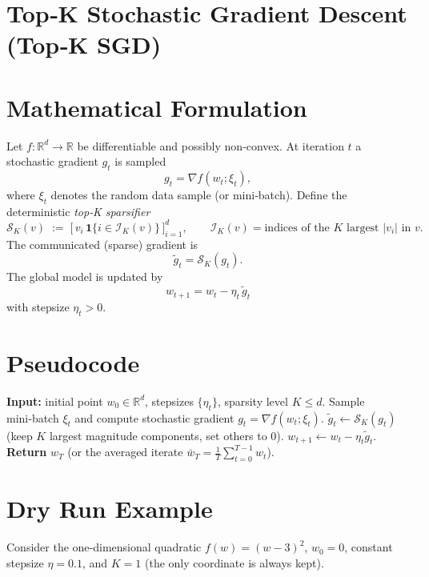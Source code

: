 \documentclass{article}
\newcommand{\R}{\mathbb{R}}
\newcommand{\topK}[2]{\mathcal{S}_{#1}(#2)}   %
\begin{document}
\section*{Top‑K Stochastic Gradient Descent (Top‑K SGD)}

\section*{Mathematical Formulation}
Let $f:\R^{d}\rightarrow\R$ be differentiable and possibly non‑convex.  
At iteration $t$ a stochastic gradient $g_{t}$ is sampled
\[
g_{t}= \nabla f(w_{t};\xi_{t}) ,
\]
where $\xi_{t}$ denotes the random data sample (or mini‑batch).  
Define the deterministic \emph{top‑K sparsifier}
\[
\topK{K}{v}\;:=\; \bigl[\,v_{i}\,\mathbf{1}\{i\in\mathcal{I}_{K}(v)\}\,\bigr]_{i=1}^{d},
\qquad 
\mathcal{I}_{K}(v)=\text{indices of the $K$ largest }|v_{i}|\text{ in }v .
\]
The communicated (sparse) gradient is
\[
\tilde g_{t}= \topK{K}{g_{t}} .
\]
The global model is updated by
\begin{equation}
\boxed{ \; w_{t+1}= w_{t}-\eta_{t}\,\tilde g_{t}\; } \label{eq:update}
\end{equation}
with stepsize $\eta_{t}>0$.

\section*{Pseudocode}
\begin{algorithm}[H]
\caption{Top‑K SGD}
\begin{algorithmic}[1]
\STATE \textbf{Input:} initial point $w_{0}\in\R^{d}$, stepsizes $\{\eta_{t}\}$, sparsity level $K\le d$.
    \STATE Sample mini‑batch $\xi_{t}$ and compute stochastic gradient $g_{t}= \nabla f(w_{t};\xi_{t})$.
    \STATE $\tilde g_{t}\leftarrow \topK{K}{g_{t}}$ (keep $K$ largest magnitude components, set others to $0$).
    \STATE $w_{t+1}\leftarrow w_{t}-\eta_{t}\tilde g_{t}$.
\ENDFOR
\STATE \textbf{Return} $w_{T}$ (or the averaged iterate $\bar w_{T}= \frac1T\sum_{t=0}^{T-1}w_{t}$).
\end{algorithmic}
\end{algorithm}

\section*{Dry Run Example}
Consider the one‑dimensional quadratic $f(w)=(w-3)^{2}$, $w_{0}=0$, constant stepsize $\eta=0.1$, and $K=1$ (the only coordinate is always kept).
\end{document}
